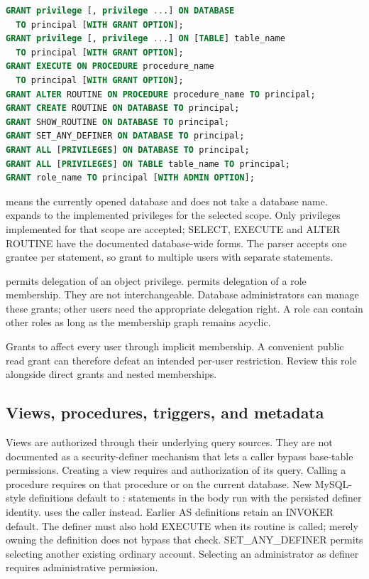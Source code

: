 \begin{lstlisting}[language=SQL]
GRANT privilege [, privilege ...] ON DATABASE
  TO principal [WITH GRANT OPTION];
GRANT privilege [, privilege ...] ON [TABLE] table_name
  TO principal [WITH GRANT OPTION];
GRANT EXECUTE ON PROCEDURE procedure_name
  TO principal [WITH GRANT OPTION];
GRANT ALTER ROUTINE ON PROCEDURE procedure_name TO principal;
GRANT CREATE ROUTINE ON DATABASE TO principal;
GRANT SHOW_ROUTINE ON DATABASE TO principal;
GRANT SET_ANY_DEFINER ON DATABASE TO principal;
GRANT ALL [PRIVILEGES] ON DATABASE TO principal;
GRANT ALL [PRIVILEGES] ON TABLE table_name TO principal;
GRANT role_name TO principal [WITH ADMIN OPTION];
\end{lstlisting}

 means the currently opened database and does not take a
database name.  expands to the implemented privileges for the
selected scope. Only privileges implemented for that scope are accepted;
SELECT, EXECUTE and ALTER ROUTINE have the documented database-wide forms.
The parser
accepts one grantee per statement, so grant to multiple users with separate
statements.

 permits delegation of an object privilege.
 permits delegation of a role membership. They
are not interchangeable. Database administrators can manage these grants;
other users need the appropriate delegation right. A role can contain other
roles as long as the membership graph remains acyclic.

Grants to  affect every user through implicit membership. A
convenient public read grant can therefore defeat an intended per-user
restriction. Review this role alongside direct grants and nested memberships.

\subsection{Views, procedures, triggers, and metadata}

Views are authorized through their underlying query sources. They are not
documented as a security-definer mechanism that lets a caller bypass base-table
permissions. Creating a view requires  and authorization of its
query. Calling a procedure requires  on that procedure or on the
current database. New MySQL-style definitions default to : statements in the body run with the persisted definer identity.
 uses the caller instead. Earlier AS definitions
retain an INVOKER default. The definer must also hold EXECUTE when its routine
is called; merely owning the definition does not bypass that check.
SET\_ANY\_DEFINER permits selecting another existing ordinary account.
Selecting an administrator as definer requires administrative permission.

